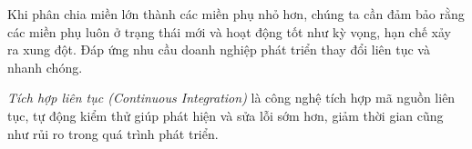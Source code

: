 Khi phân chia miền lớn thành các miền phụ nhỏ hơn, chúng ta cần đảm bảo rằng các miền phụ luôn ở trạng thái mới và hoạt động tốt như kỳ vọng, hạn chế xảy ra xung đột. Đáp ứng nhu cầu doanh nghiệp phát triển thay đổi liên tục và nhanh chóng.

\emph{Tích hợp liên tục (Continuous Integration)} là công nghệ tích hợp mã nguồn liên tục, tự động kiểm thử giúp phát hiện và sửa lỗi sớm hơn, giảm thời gian cũng như rủi ro trong quá trình phát triển.












